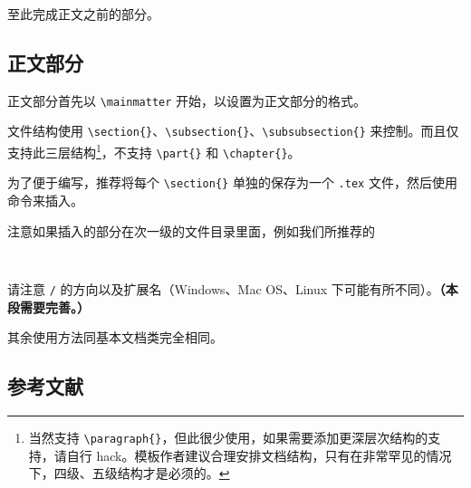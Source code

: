 \documentclass[%
               amsthm,
              ]{xjtubsc}
\begin{document}
至此完成正文之前的部分。

\subsection{正文部分}

正文部分首先以 \verb|\mainmatter| 开始，以设置为正文部分的格式。

文件结构使用 \verb|\section{}|、\verb|\subsection{}|、\verb|\subsubsection{}| 来控制。而且仅支持此三层结构\footnote{当然支持 \verb|\paragraph{}|，但此很少使用，如果需要添加更深层次结构的支持，请自行 hack。模板作者建议合理安排文档结构，只有在非常罕见的情况下，四级、五级结构才是必须的。}，不支持 \verb|\part{}| 和 \verb|\chapter{}|。

为了便于编写，推荐将每个 \verb|\section{}| 单独的保存为一个 \verb|.tex| 文件，然后使用 \verb|| 命令来插入。

注意如果插入的部分在次一级的文件目录里面，例如我们所推荐的
\begin{verbatim}
    
\end{verbatim}
请注意 \verb|/| 的方向以及扩展名（Windows、Mac OS、Linux 下可能有所不同）。\textbf{（本段需要完善。）}

其余使用方法同基本文档类完全相同。

\subsection{参考文献}
\end{document}
